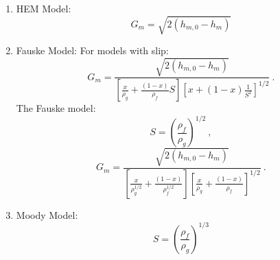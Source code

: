 \documentclass[12pt]{article}
\begin{document}
\begin{enumerate}
    \item HEM Model:
    \begin{equation}
        G_m = \sqrt{2 \left( h_{m,0} - h_m \right)}
    \end{equation}
    
    
    
    \clearpage
    \item Fauske Model:
    For models with slip:
    \begin{equation}
        G_m = \frac{\sqrt{2 \left( h_{m,0} - h_m \right)}}{\left[ \frac{x}{\rho_g} + \frac{\left( 1-x \right)}{\rho_f} S \right] \left[ x + \left( 1-x \right)\frac{1}{S^2} \right]^{1/2}}\:.
    \end{equation}
    The Fauske model:
    \begin{equation}
        S = \left( \frac{\rho_f}{\rho_g} \right)^{1/2}\:,
    \end{equation}
    \begin{equation}
        G_m = \frac{\sqrt{2 \left( h_{m,0} - h_m \right)}}{\left[ \frac{x}{\rho_g^{1/2}} + \frac{\left( 1-x \right)}{\rho_f^{1/2}} \right] \left[ \frac{x}{\rho_g} + \frac{\left( 1-x \right)}{\rho_f} \right]^{1/2}}\:.
    \end{equation}
    
    
    
    \clearpage
    \item Moody Model:
    \begin{equation}
        S = \left( \frac{\rho_f}{\rho_g} \right)^{1/3}
    \end{equation}
    



\end{enumerate}
\end{document}
